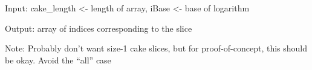 \documentclass[letterpaper,10pt,english]{sphinxmanual}
\begin{document}

\begin{fulllineitems}
\label{index:halla.stats.cumulative_log_cut}
Input: cake\_length \textless{}- length of array, iBase \textless{}- base of logarithm

Output: array of indices corresponding to the slice

Note: Probably don't want size-1 cake slices, but for proof-of-concept, this should be okay. 
Avoid the ``all'' case

\end{fulllineitems}

\end{document}
